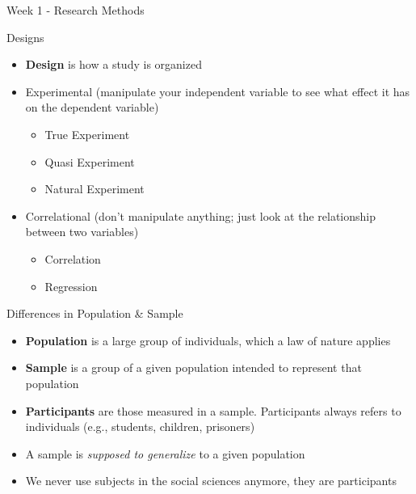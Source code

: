 \documentclass[
  ignorenonframetext,
]{beamer}
\providecommand{\tightlist}{%
  \setlength{\itemsep}{0pt}\setlength{\parskip}{0pt}}\usepackage{longtable,booktabs,array}
\begin{document}
\begin{frame}{Week 1 - Research Methods}
\label{week-1---research-methods}
\end{frame}

\begin{frame}{Designs}
\label{designs}
\begin{itemize}
\item
  \textbf{Design} is how a study is organized
\item
  Experimental (manipulate your independent variable to see what effect
  it has on the dependent variable)

  \begin{itemize}
  \tightlist
  \item
    True Experiment
  \item
    Quasi Experiment
  \item
    Natural Experiment
  \end{itemize}
\item
  Correlational (don't manipulate anything; just look at the
  relationship between two variables)

  \begin{itemize}
  \tightlist
  \item
    Correlation
  \item
    Regression
  \end{itemize}
\end{itemize}
\end{frame}

\begin{frame}{Differences in Population \& Sample}
\label{differences-in-population-sample}
\begin{itemize}
\item
  \textbf{Population} is a large group of individuals, which a law of
  nature applies
\item
  \textbf{Sample} is a group of a given population intended to represent
  that population
\item
  \textbf{Participants} are those measured in a sample. Participants
  always refers to individuals (e.g., students, children, prisoners)
\item
  A sample is \emph{supposed to generalize} to a given population
\item
  We never use subjects in the social sciences anymore, they are
  participants
\end{itemize}
\end{frame}
\end{document}
